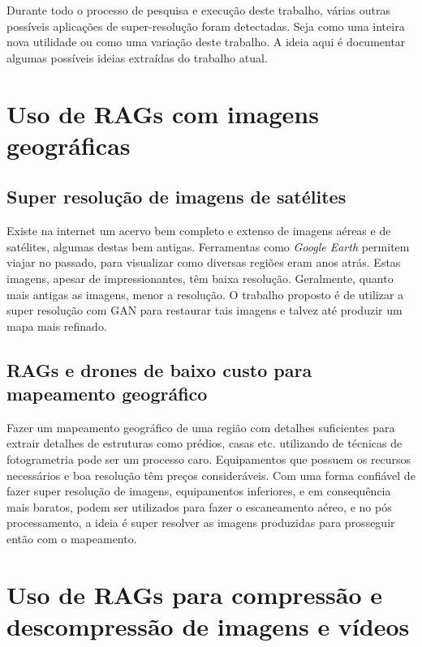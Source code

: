 \label{sec:trabalhos-futuros}

Durante todo o processo de pesquisa e execução deste trabalho, várias outras possíveis aplicações de super-resolução foram detectadas. Seja como uma inteira nova utilidade ou como uma variação deste trabalho. A ideia aqui é documentar algumas possíveis ideias extraídas do trabalho atual.

\section{Uso de RAGs com imagens geográficas}
\label{sec:trabalhos-futuros:imagens-geograficas}

\subsection{Super resolução de imagens de satélites}
\label{sec:trabalhos-futuros:imagens-geograficas:imagens-satelites}

Existe na internet um acervo bem completo e extenso de imagens aéreas e de satélites, algumas destas bem antigas. Ferramentas como \textit{Google Earth} permitem viajar no passado, para visualizar como diversas regiões eram anos atrás. Estas imagens, apesar de impressionantes, têm baixa resolução. Geralmente, quanto mais antigas as imagens, menor a resolução. O trabalho proposto é de utilizar a super resolução com GAN para restaurar tais imagens e talvez até produzir um mapa mais refinado. 

\subsection{RAGs e drones de baixo custo para mapeamento geográfico}
\label{sec:trabalhos-futuros:imagens-geograficas:mapeamento-geografico-drone}

Fazer um mapeamento geográfico de uma região com detalhes suficientes para extrair detalhes de estruturas como prédios, casas etc. utilizando de técnicas de fotogrametria pode ser um processo caro. Equipamentos que possuem os recursos necessários e boa resolução têm preços consideráveis. Com uma forma confiável de fazer super resolução de imagens, equipamentos inferiores, e em consequência mais baratos, podem ser utilizados para fazer o escaneamento aéreo, e no pós processamento, a ideia é super resolver as imagens produzidas para prosseguir então com o mapeamento. 

\section{Uso de RAGs para compressão e descompressão de imagens e vídeos}
\label{sec:trabalhos-futuros:compressao-descompressao}

